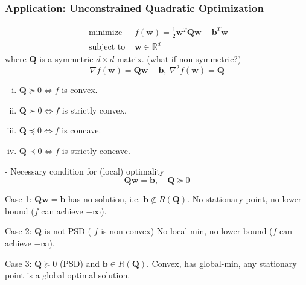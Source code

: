 \documentclass[11pt,a4paper]{article}
\begin{document}
\subsubsection{Application: Unconstrained Quadratic Optimization}
$$\begin{array}{ll}\text { minimize } & f(\mathbf{w})=\frac{1}{2} \mathbf{w}^{T} \mathbf{Q} \mathbf{w}-\mathbf{b}^{T} \mathbf{w} \\ \text { subject to } & \mathbf{w} \in \mathbb{R}^{d}\end{array}$$
where $\mathbf{Q}$ is a symmetric $d \times d$ matrix. (what if non-symmetric?)
$$\nabla f(\mathbf{w})=\mathbf{Q}\mathbf{w}-\mathbf{b},\ \nabla^2 f(\mathbf{w})=\mathbf{Q}$$
\begin{enumerate}[(i)]
    \item $\mathbf{Q}\succeq 0 \Leftrightarrow	f$ is convex.
    \item $\mathbf{Q}\succ 0 \Leftrightarrow	f$ is strictly convex.
    \item $\mathbf{Q}\preceq 0 \Leftrightarrow	f$ is concave.
    \item $\mathbf{Q}\prec 0 \Leftrightarrow	f$ is strictly concave.
\end{enumerate}









- Necessary condition for (local) optimality
$$
\mathbf{Q} \mathbf{w}=\mathbf{b}, \quad \mathbf{Q} \succeq 0
$$

Case 1: $\mathbf{Q w}=\mathbf{b}$ has no solution, i.e. $\mathbf{b} \notin R(\mathbf{Q})$. No stationary point, no lower bound ($f$ can achieve $-\infty$).

Case 2: $\mathbf{Q}$ is not PSD ( $f$ is non-convex)
No local-min, no lower bound ($f$ can achieve $-\infty$).

Case 3: $\mathbf{Q} \succeq 0$ (PSD) and $\mathbf{b} \in R(\mathbf{Q})$. Convex, has global-min, 
any stationary point is a global optimal solution.
\end{document}
